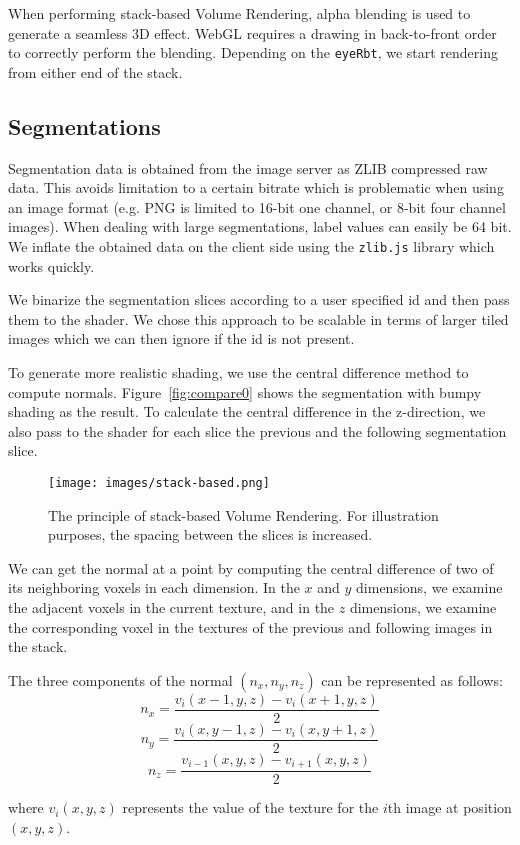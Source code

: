 \documentclass[annual]{acmsiggraph}
\begin{document}
When performing stack-based Volume Rendering, alpha blending is used to generate a seamless 3D effect. WebGL requires a drawing in back-to-front order to correctly perform the blending. Depending on the \texttt{eyeRbt}, we start rendering from either end of the stack.

\subsection{Segmentations}
Segmentation data is obtained from the image server as ZLIB compressed raw data. This avoids limitation to a certain bitrate which is problematic when using an image format (e.g. PNG is limited to 16-bit one channel, or 8-bit four channel images). When dealing with large segmentations, label values can easily be 64 bit. We inflate the obtained data on the client side using the \texttt{zlib.js} library which works quickly.

We binarize the segmentation slices according to a user specified id and then pass them to the shader. We chose this approach to be scalable in terms of larger tiled images which we can then ignore if the id is not present. 

To generate more realistic shading, we use the central difference method to compute normals. Figure~\ref{fig:compare0} shows the segmentation with bumpy shading as the result. To calculate the central difference in the z-direction, we also pass to the shader for each slice the previous and the following segmentation slice.

\begin{figure}[h]
\caption{The principle of stack-based Volume Rendering. For illustration purposes, the spacing between the slices is increased.}
\texttt{[image: images/stack-based.png]} 
\end{figure}

We can get the normal at a point by computing the central difference of two of its neighboring voxels in each dimension. In the $x$ and $y$ dimensions, we examine the adjacent voxels in the current texture,  and in the $z$ dimensions, we examine the corresponding voxel in the textures of the previous and following images in the stack.

The three components of the normal $(n_x,n_y,n_z)$ can be represented as follows:
\[ n_x=\frac{v_i(x-1,y,z)-v_i(x+1,y,z)}{2}\]
\[n_y=\frac{v_i(x,y-1,z)-v_i(x,y+1,z)}{2}\]
\[n_z=\frac{v_{i-1}(x,y,z)-v_{i+1}(x,y,z)}{2}\]

where $v_i(x,y,z)$ represents the value of the texture for the $i$th image at position $(x,y,z)$.
\end{document}
